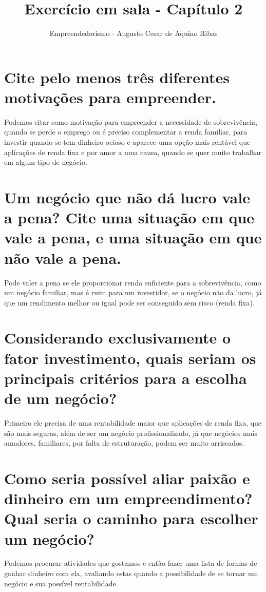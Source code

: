 \documentclass[a4paper,10pt]{article}
\author{Empreendedorismo - Augusto Cesar de Aquino Ribas}
\title{Exercício em sala - Capítulo 2}
\begin{document}
\maketitle

\section{Cite pelo menos três diferentes motivações para empreender.}

Podemos citar como motivação para empreender a necessidade de sobrevivência, quando se perde o emprego ou é preciso complementar a renda familiar, para investir quando se tem dinheiro ocioso e aparece uma opção mais rentável que aplicações de renda fixa e por amor a uma causa, quando se quer muito trabalhar em algum tipo de negócio.

\section{Um negócio que não dá lucro vale a pena? Cite uma situação em que vale a pena, e uma situação em que não vale a pena.}

Pode valer a pena se ele proporcionar renda suficiente para a sobrevivência, como um negócio familiar, mas é ruim para um investidor, se o negócio não da lucro, já que um rendimento melhor ou igual pode ser conseguido sem risco (renda fixa).


\section{Considerando exclusivamente o fator investimento, quais seriam os principais critérios para a escolha de um negócio?}


Primeiro ele precisa de uma rentabilidade maior que aplicações de renda fixa, que são mais seguras, além de ser um negócio profissionalizado, já que negócios mais amadores, familiares, por falta de estruturação, podem ser muito arriscados.


\section{Como seria possível aliar paixão e dinheiro em um empreendimento? Qual seria o caminho para escolher um negócio?}

Podemos procurar atividades que gostamos e então fazer uma lista de formas de ganhar dinheiro com ela, avaliando estas quando a possibilidade de se tornar um negócio e sua possível rentabilidade.
\end{document}
